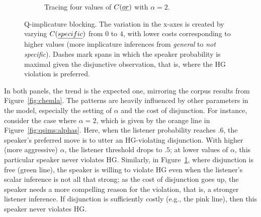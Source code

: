 \documentclass[12pt,twoside]{article}
\newcommand{\figref}[1]{Figure~\ref{#1}}
\newcommand{\word}[1]{\emph{#1}}
\newcommand{\Costs}{C}
\renewcommand{\_}{\textbf{\textunderscore\hspace{-4pt}\textunderscore\hspace{-3pt}\textunderscore\hspace{-4pt}\textunderscore}\hspace{0.5pt}}			%
\begin{document}
\begin{figure}[tp]
\begin{subfigure}{0.48\textwidth}
    \caption{Tracing four values of $\Costs(\word{or})$ with $\alpha=2$.}\label{fig:qsims:or}
  \end{subfigure}
  \caption{Q-implicature blocking. The variation in the x-axes is
    created by varying $\Costs(\word{specific})$ from $0$ to $4$, with
    lower costs corresponding to higher values (more implicature
    inferences from \word{general} to \word{not specific}). Dashes
    mark spans in which the speaker probability is maximal given the
    disjunctive observation, that is, where the HG violation is
    preferred.}\label{fig:qsims}
\end{figure}

In both panels, the trend is the expected one, mirroring the corpus
results from \figref{fig:chemla}. The patterns are heavily influenced
by other parameters in the model, especially the setting of $\alpha$
and the cost of disjunction. For instance, consider the case where
$\alpha=2$, which is given by the orange line in
\figref{fig:qsims:alphas}. Here, when the listener probability reaches
$.6$, the speaker's preferred move is to utter an HG-violating
disjunction. With higher (more aggressive) $\alpha$, the listener
threshold drops to $.5$; at lower values of $\alpha$, this particular
speaker never violates HG. Similarly, in \figref{fig:qsims:or}, where
disjunction is free (green line), the speaker is willing to violate HG
even when the listener's scalar inference is not all that strong; as
the cost of disjunction goes up, the speaker needs a more compelling
reason for the violation, that is, a stronger listener inference. If
disjunction is sufficiently costly (e.g., the pink line), then this
speaker never violates HG.
\end{document}
